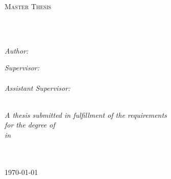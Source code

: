 \documentclass[
12pt, %
oneside, %
english, %
doublespacing, %
parskip, %
headsepline, %
chapterinoneline, %
]{MastersDoctoralThesis} %
\author{Xhoni \textsc{Robo}} %
\begin{document}
\frontmatter %

\pagestyle{plain} %


\begin{titlepage}
\begin{center}

{\scshape\LARGE \univname\par}\vspace{1.5cm} %
\textsc{\Large Master Thesis}\\[0.5cm] %

\HRule \\ %
{\huge \bfseries \ttitle\par}\vspace{0.4cm} %
\HRule \\ %
 
\begin{minipage}[t]{0.4\textwidth}
\begin{flushleft} \large
\emph{Author:}\\
{\authorname} %
\end{flushleft}
\end{minipage}
\begin{minipage}[t]{0.4\textwidth}
\begin{flushright} \large
\emph{Supervisor:} \\
{\supname} \\ %
\emph{Assistant Supervisor:} \\
{\examname} %
\end{flushright}
\end{minipage}\\[1.0cm]


\large \textit{A thesis submitted in fulfillment of the requirements\\ for the degree of \degreename}\\[0.3cm] %
\textit{in}\\[0.4cm]
\groupname\\\facname\\[0.5cm] %
 
\vfill

{\large \today}\\[2cm] %
 
\vfill
\end{center}
\end{titlepage}
\end{document}
